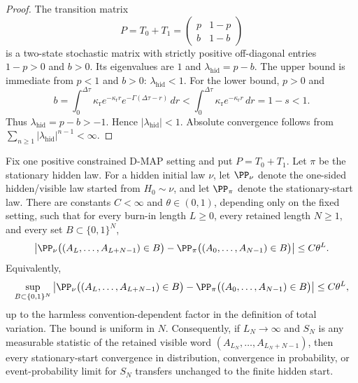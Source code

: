 \begin{proof}
The transition matrix
\[
P=T_0+T_1=
\begin{pmatrix}
p&1-p\\ b&1-b
\end{pmatrix}
\]
is a two-state stochastic matrix with strictly positive off-diagonal entries
\(1-p>0\) and \(b>0\).  Its eigenvalues are \(1\) and
\(\lambda_{\mathrm{hid}}=p-b\).  The upper bound is immediate from \(p<1\)
and \(b>0\): \(\lambda_{\mathrm{hid}}<1\).  For the lower bound, \(p>0\) and
\[
b=\int_0^{\Delta\tau}\kappa_{\mathrm r}e^{-\kappa_{\mathrm r}r}
e^{-\Gamma(\Delta\tau-r)}\,dr
<\int_0^{\Delta\tau}\kappa_{\mathrm r}e^{-\kappa_{\mathrm r}r}\,dr
=1-s<1 .
\]
Thus \(\lambda_{\mathrm{hid}}=p-b>-1\).  Hence
\(|\lambda_{\mathrm{hid}}|<1\).  Absolute convergence follows from
\(\sum_{n\ge1}|\lambda_{\mathrm{hid}}|^{n-1}<\infty\).
\end{proof}

\begin{lemma}\label{lem:finite-hidden-start-path-contraction-main}
Fix one positive constrained D-MAP setting and put \(P=T_0+T_1\).  Let
\(\pi\) be the stationary hidden law.  For a hidden initial law \(\nu\), let
\(\PP_\nu\) denote the one-sided hidden/visible law started from \(H_0\sim\nu\),
and let \(\PP_\pi\) denote the stationary-start law.  There are constants
\(C<\infty\) and \(\theta\in(0,1)\), depending only on the fixed setting, such
that for every burn-in length \(L\ge0\), every retained length \(N\ge1\), and
every set \(B\subset\{0,1\}^N\),
\begin{equation}\label{eq:finite-hidden-start-path-tv-main}
\left|
\PP_\nu\bigl((A_L,\ldots,A_{L+N-1})\in B\bigr)
-
\PP_\pi\bigl((A_0,\ldots,A_{N-1})\in B\bigr)
\right|
\le C\theta^L .
\end{equation}
Equivalently,
\[
\sup_{B\subset\{0,1\}^N}
\left|
\PP_\nu\bigl((A_L,\ldots,A_{L+N-1})\in B\bigr)
-
\PP_\pi\bigl((A_0,\ldots,A_{N-1})\in B\bigr)
\right|
\le C\theta^L ,
\]
up to the harmless convention-dependent factor in the definition of total
variation.  The bound is uniform in \(N\).  Consequently, if \(L_N\to\infty\)
and \(S_N\) is any measurable statistic of the retained visible word
\((A_{L_N},\ldots,A_{L_N+N-1})\), then every stationary-start convergence in
distribution, convergence in probability, or event-probability limit for
\(S_N\) transfers unchanged to the finite hidden start.
\end{lemma}

